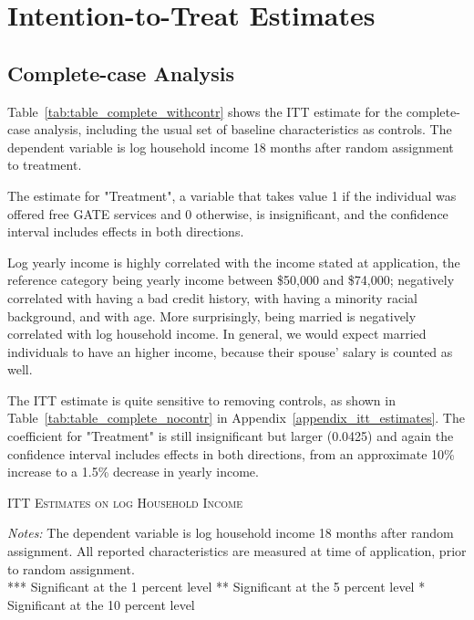 
\section{Intention-to-Treat Estimates}

\subsection{Complete-case Analysis}

Table~\ref{tab:table_complete_withcontr} shows the ITT estimate for the complete-case analysis, including the usual set of baseline characteristics as controls. The dependent variable is log household income 18 months after random assignment to treatment.

The estimate for "Treatment", a variable that takes value 1 if the individual was offered free GATE services and 0 otherwise, is insignificant, and the confidence interval includes effects in both directions.

Log yearly income is highly correlated with the income stated at application, the reference category being yearly income between \$50,000 and \$74,000; negatively correlated with having a bad credit history, with having a minority racial background, and with age. More surprisingly, being married is negatively correlated with log household income. In general, we would expect married individuals to have an higher income, because their spouse' salary is counted as well.

The ITT estimate is quite sensitive to removing controls, as shown in Table~\ref{tab:table_complete_nocontr} in Appendix~\ref{appendix_itt_estimates}. The coefficient for "Treatment" is still insignificant but larger (0.0425) and again the confidence interval includes effects in both directions, from an approximate 10\% increase to a 1.5\% decrease in yearly income.

\begin{table}[t!]
\centering
\caption{\textsc{ITT Estimates on log Household Income}}



\medskip
\begin{adjustbox}{width=0.825\textwidth, totalheight=\textheight, keepaspectratio}

\end{adjustbox}

\label{tab:table_complete_withcontr}
\bigskip
\raggedright
\footnotesize
\textit{Notes:} The dependent variable is log household income 18 months after random assignment. All reported characteristics are measured at time of application, prior to random assignment. \\
*** Significant at the 1 percent level ** Significant at the 5 percent level * Significant at the 10 percent level
\end{table}
